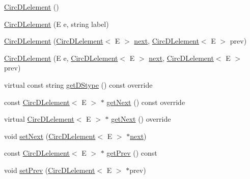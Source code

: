 \begin{DoxyCompactItemize}
\item 
\hyperlink{classbridges_1_1datastructure_1_1_circ_d_lelement_acd151aff05440f2c6fe26f41b46e0668}{Circ\+D\+Lelement} ()
\item 
\hyperlink{classbridges_1_1datastructure_1_1_circ_d_lelement_a88232de87ec750fccd655d6591870f4c}{Circ\+D\+Lelement} (E e, string label)
\item 
\hyperlink{classbridges_1_1datastructure_1_1_circ_d_lelement_a8db4aa80feb388d5206d657d80385f16}{Circ\+D\+Lelement} (\hyperlink{classbridges_1_1datastructure_1_1_circ_d_lelement}{Circ\+D\+Lelement}$<$ E $>$ \hyperlink{classbridges_1_1datastructure_1_1_s_lelement_afc016a593a4a5aba82021ee34edadbfc}{next}, \hyperlink{classbridges_1_1datastructure_1_1_circ_d_lelement}{Circ\+D\+Lelement}$<$ E $>$ prev)
\item 
\hyperlink{classbridges_1_1datastructure_1_1_circ_d_lelement_a52b304df48ac1ba5a13b4c3c596f433b}{Circ\+D\+Lelement} (E e, \hyperlink{classbridges_1_1datastructure_1_1_circ_d_lelement}{Circ\+D\+Lelement}$<$ E $>$ \hyperlink{classbridges_1_1datastructure_1_1_s_lelement_afc016a593a4a5aba82021ee34edadbfc}{next}, \hyperlink{classbridges_1_1datastructure_1_1_circ_d_lelement}{Circ\+D\+Lelement}$<$ E $>$ prev)
\item 
virtual const string \hyperlink{classbridges_1_1datastructure_1_1_circ_d_lelement_aec7f9b9dc6626c1a872feb91cd65425d}{get\+D\+Stype} () const override
\item 
const \hyperlink{classbridges_1_1datastructure_1_1_circ_d_lelement}{Circ\+D\+Lelement}$<$ E $>$ $\ast$ \hyperlink{classbridges_1_1datastructure_1_1_circ_d_lelement_a3b54f07ffa49151ed13d8b8df964a4ee}{get\+Next} () const override
\item 
virtual \hyperlink{classbridges_1_1datastructure_1_1_circ_d_lelement}{Circ\+D\+Lelement}$<$ E $>$ $\ast$ \hyperlink{classbridges_1_1datastructure_1_1_circ_d_lelement_a80681d0382643a6df21da1bec4067004}{get\+Next} () override
\item 
void \hyperlink{classbridges_1_1datastructure_1_1_circ_d_lelement_aa19f430c7b00a6d38187021255f741e4}{set\+Next} (\hyperlink{classbridges_1_1datastructure_1_1_circ_d_lelement}{Circ\+D\+Lelement}$<$ E $>$ $\ast$\hyperlink{classbridges_1_1datastructure_1_1_s_lelement_afc016a593a4a5aba82021ee34edadbfc}{next})
\item 
const \hyperlink{classbridges_1_1datastructure_1_1_circ_d_lelement}{Circ\+D\+Lelement}$<$ E $>$ $\ast$ \hyperlink{classbridges_1_1datastructure_1_1_circ_d_lelement_a7176c3ca8347d8d9324a86265c7d6f84}{get\+Prev} () const
\item 
void \hyperlink{classbridges_1_1datastructure_1_1_circ_d_lelement_ac47b0221a0eebc3c539eec1700f2c776}{set\+Prev} (\hyperlink{classbridges_1_1datastructure_1_1_circ_d_lelement}{Circ\+D\+Lelement}$<$ E $>$ $\ast$prev)
\end{DoxyCompactItemize}
